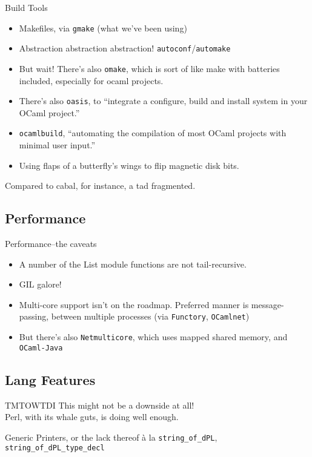 \documentclass{beamer}
\begin{document}
\begin{frame}{Build Tools}
  \begin{itemize}
  \item Makefiles, via \texttt{gmake} (what we've been using)
    \pause
  \item Abstraction abstraction abstraction! \texttt{autoconf}/\texttt{automake}
    \pause
  \item But wait! There's also \texttt{omake}, which is sort of like make with
    batteries included, especially for ocaml projects.
    \pause
  \item There's also \texttt{oasis}, to ``integrate a configure, build and
    install system in your OCaml project.''
    \pause
  \item \texttt{ocamlbuild}, ``automating the compilation of most OCaml
    projects with minimal user input.''
    \pause
  \item Using flaps of a butterfly's wings to flip magnetic disk bits.
    \pause
  \end{itemize}
  Compared to cabal, for instance, a tad fragmented.
\end{frame}

\subsection{Performance}


\begin{frame}{Performance--the caveats}
  \begin{itemize}
  \item A number of the List module functions are not tail-recursive.
    \pause
  \item GIL galore!
    \pause
  \item Multi-core support isn't on the roadmap. Preferred manner is
    message-passing, between multiple processes (via
    \texttt{Functory}, \texttt{OCamlnet})
    \pause
  \item But there's also \texttt{Netmulticore}, which uses mapped
    shared memory, and \texttt{OCaml-Java}
  \end{itemize}
\end{frame}

\subsection{Lang Features}


\begin{frame}{}
  \begin{block}{TMTOWTDI}
    This might not be a downside at all!\\
    Perl, with its whale guts, is doing well enough.
  \end{block}
  \begin{block}{Generic Printers, or the lack thereof}
    à la \texttt{string\_of\_dPL}, \texttt{string\_of\_dPL\_type\_decl}
  \end{block}
\end{frame}
\end{document}
